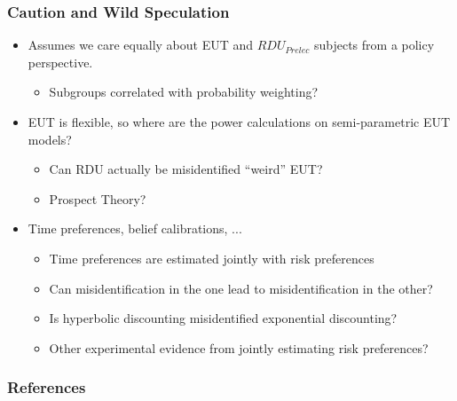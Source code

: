 \documentclass{beamer}
\begin{document}
\begin{frame}
\frametitle{Caution and Wild Speculation}
\begin{itemize}
	\item Assumes we care equally about EUT and $\mathit{RDU_{Prelec}}$ subjects from a policy perspective.
		\begin{itemize}
			\item Subgroups correlated with probability weighting?
		\end{itemize}
	\item EUT is flexible, so where are the power calculations on semi-parametric EUT models?
		\begin{itemize}
			\item Can RDU actually be misidentified \enquote{weird} EUT?
			\item Prospect Theory?
		\end{itemize}
	\item Time preferences, belief calibrations, ...
		\begin{itemize}
			\item Time preferences are estimated jointly with risk preferences
			\item Can misidentification in the one lead to misidentification in the other?
			\item Is hyperbolic discounting misidentified exponential discounting?
			\item Other experimental evidence from jointly estimating risk preferences?
		\end{itemize}
\end{itemize}
\end{frame}

\begin{frame}[allowframebreaks]
\frametitle{References}
\printbibliography[heading=subbibliography]
\end{frame}
\end{document}
